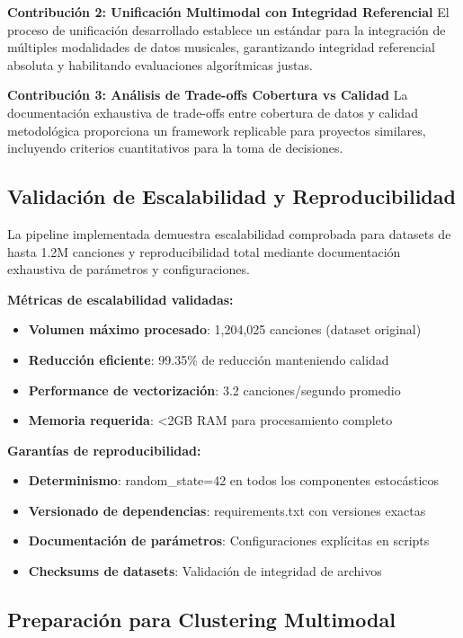 \documentclass[12pt,a4paper]{report}
\begin{document}
\textbf{Contribución 2: Unificación Multimodal con Integridad Referencial}
El proceso de unificación desarrollado establece un estándar para la integración de múltiples modalidades de datos musicales, garantizando integridad referencial absoluta y habilitando evaluaciones algorítmicas justas.

\textbf{Contribución 3: Análisis de Trade-offs Cobertura vs Calidad}
La documentación exhaustiva de trade-offs entre cobertura de datos y calidad metodológica proporciona un framework replicable para proyectos similares, incluyendo criterios cuantitativos para la toma de decisiones.

\subsection{Validación de Escalabilidad y Reproducibilidad}

La pipeline implementada demuestra escalabilidad comprobada para datasets de hasta 1.2M canciones y reproducibilidad total mediante documentación exhaustiva de parámetros y configuraciones.

\textbf{Métricas de escalabilidad validadas:}
\begin{itemize}[leftmargin=*]
    \item \textbf{Volumen máximo procesado}: 1,204,025 canciones (dataset original)
    \item \textbf{Reducción eficiente}: 99.35\% de reducción manteniendo calidad
    \item \textbf{Performance de vectorización}: 3.2 canciones/segundo promedio
    \item \textbf{Memoria requerida}: <2GB RAM para procesamiento completo
\end{itemize}

\textbf{Garantías de reproducibilidad:}
\begin{itemize}[leftmargin=*]
    \item \textbf{Determinismo}: random\_state=42 en todos los componentes estocásticos
    \item \textbf{Versionado de dependencias}: requirements.txt con versiones exactas
    \item \textbf{Documentación de parámetros}: Configuraciones explícitas en scripts
    \item \textbf{Checksums de datasets}: Validación de integridad de archivos
\end{itemize}

\subsection{Preparación para Clustering Multimodal}
\end{document}
